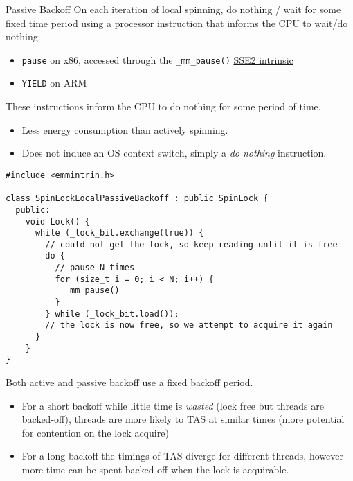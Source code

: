 \begin{definitionbox}{Passive Backoff}
  On each iteration of local spinning, do nothing / wait for some fixed time period using a processor instruction that informs the CPU to wait/do nothing.
  \begin{itemize}
    \item \texttt{pause} on x86, accessed through the \texttt{_mm_pause()} \href{https://www.intel.com/content/www/us/en/docs/intrinsics-guide/index.html#techs=SSE2}{SSE2 intrinsic}
    \item \texttt{YIELD} on ARM
  \end{itemize}
  These instructions inform the CPU to do nothing for some period of time.
  \begin{itemize}
    \item Less energy consumption than actively spinning.
    \item Does not induce an OS context switch, simply a \textit{do nothing} instruction.
  \end{itemize}
\end{definitionbox}
\begin{verbatim}
#include <emmintrin.h>

class SpinLockLocalPassiveBackoff : public SpinLock {
  public:
    void Lock() {
      while (_lock_bit.exchange(true)) { 
        // could not get the lock, so keep reading until it is free
        do {
          // pause N times
          for (size_t i = 0; i < N; i++) {
            _mm_pause()
          }
        } while (_lock_bit.load());
        // the lock is now free, so we attempt to acquire it again
      }
    }
}
\end{verbatim}

Both active and passive backoff use a fixed backoff period.
\begin{itemize}
  \item For a short backoff while little time is \textit{wasted} (lock free but threads are backed-off), threads are more likely to TAS at similar times (more potential for contention on the lock acquire)
  \item For a long backoff the timings of TAS diverge for different threads, however more time can be spent backed-off when the lock is acquirable.
\end{itemize}

